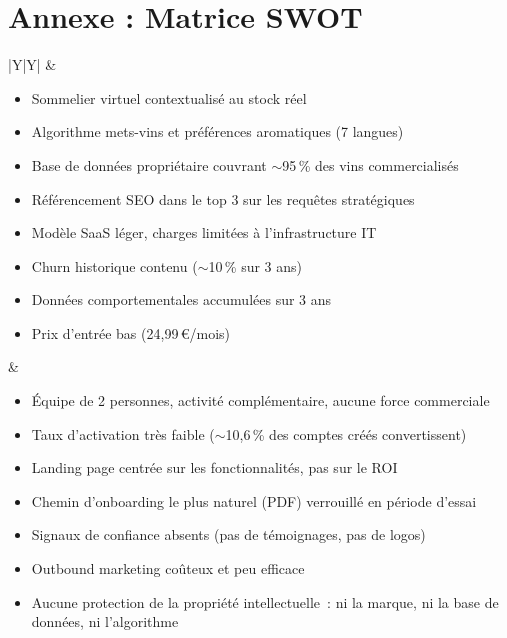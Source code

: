 \documentclass[12pt, a4paper]{article}
\newcounter{annexe}
\begin{document}
\vspace{2em}
{}\label{annexe:swot}
\section*{Annexe \theannexe : Matrice SWOT}

\vspace{0.5em}
{\small
\begin{tabularx}{\linewidth}{|Y|Y|}
  \hline
   &
   \\
  \hline
  \begin{itemize}[leftmargin=1em, topsep=1pt, itemsep=0pt, parsep=0pt]
    \item Sommelier virtuel contextualisé au stock réel
    \item Algorithme mets-vins et préférences aromatiques (7 langues)
    \item Base de données propriétaire couvrant $\sim$95\,\% des vins commercialisés
    \item Référencement SEO dans le top 3 sur les requêtes stratégiques
    \item Modèle SaaS léger, charges limitées à l'infrastructure IT
    \item Churn historique contenu ($\sim$10\,\% sur 3 ans)
    \item Données comportementales accumulées sur 3 ans
    \item Prix d'entrée bas (24,99\,€/mois)
  \end{itemize} &
  \begin{itemize}[leftmargin=1em, topsep=1pt, itemsep=0pt, parsep=0pt]
    \item Équipe de 2 personnes, activité complémentaire, aucune force commerciale
    \item Taux d'activation très faible ($\sim$10,6\,\% des comptes créés convertissent)
    \item Landing page centrée sur les fonctionnalités, pas sur le ROI
    \item Chemin d'onboarding le plus naturel (PDF) verrouillé en période d'essai
    \item Signaux de confiance absents (pas de témoignages, pas de logos)
    \item Outbound marketing coûteux et peu efficace
    \item Aucune protection de la propriété intellectuelle~: ni la marque, ni la base de données, ni l'algorithme

\end{itemize}
\end{tabularx}}
\end{document}
